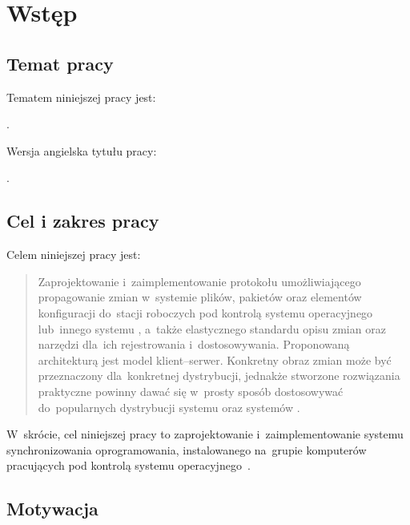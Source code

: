 \documentclass[thesis]{subfiles}
\makeatletter
\let\inserttitle\@title
\let\inserttitleaux\@titleaux
\makeatother
\begin{document}
\chapter{Wstęp}
\label{chapter:intro}

\section{Temat pracy}

\noindent Tematem niniejszej pracy jest:
\begin{displayquote}
\inserttitle.
\end{displayquote}
Wersja angielska tytułu pracy:
\begin{displayquote}
\inserttitleaux.
\end{displayquote}


\section{Cel i zakres pracy}
\label{cel-i-zakres}

\noindent Celem niniejszej pracy jest:
\blockcquote{formularz-zgloszenia-pracy}{Zaprojektowanie i~zaimplementowanie protokołu umożliwiającego propagowanie zmian w~systemie plików, pakietów oraz elementów konfiguracji do~stacji roboczych pod kontrolą systemu operacyjnego  lub~innego systemu , a~także elastycznego standardu opisu zmian oraz narzędzi dla~ich rejestrowania i~dostosowywania. Proponowaną architekturą jest model klient--serwer. Konkretny obraz zmian może być przeznaczony dla~konkretnej dystrybucji, jednakże stworzone rozwiązania praktyczne powinny dawać się w~prosty sposób dostosowywać do~popularnych dystrybucji systemu  oraz systemów .}
W~skrócie, cel niniejszej pracy to zaprojektowanie i~zaimplementowanie systemu synchronizowania oprogramowania, instalowanego na~grupie komputerów pracujących pod kontrolą systemu operacyjnego~.


\section{Motywacja}
\end{document}
